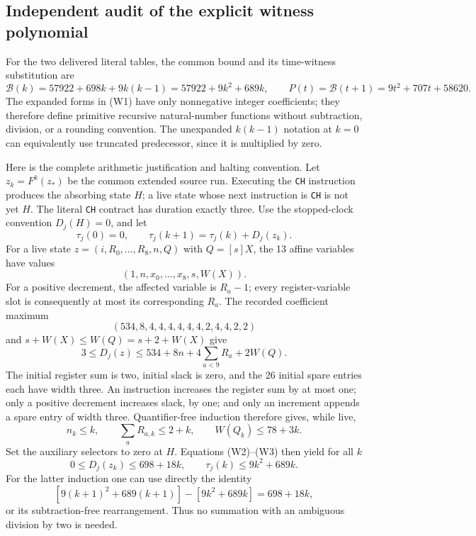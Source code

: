 \subsection{Independent audit of the explicit witness polynomial}
\label{sec:polynomial-witness-audit}

For the two delivered literal tables, the common bound and its
time-witness substitution are
\[
 \mathcal B(k)=57922+698k+9k(k-1)=57922+9k^2+689k,
 \qquad
 P(t)=\mathcal B(t+1)=9t^2+707t+58620.                         \tag{W1}
\]
The expanded forms in (W1) have only nonnegative integer coefficients;
they therefore define primitive recursive natural-number functions
without subtraction, division, or a rounding convention.  The
unexpanded $k(k-1)$ notation at $k=0$ can equivalently use truncated
predecessor, since it is multiplied by zero.

Here is the complete arithmetic justification and halting convention.
Let $z_k=F^k(z_*)$ be the common extended source run.  Executing the
\texttt{CH} instruction produces the absorbing state $H$; a live state
whose next instruction is \texttt{CH} is not yet $H$.  The literal
\texttt{CH} contract has duration exactly three.  Use the stopped-clock
convention $D_j(H)=0$, and let
\[
 \tau_j(0)=0,\qquad
 \tau_j(k+1)=\tau_j(k)+D_j(z_k).
                                                               \tag{W2}
\]
For a live state $z=(i,R_0,\ldots,R_8,n,Q)$ with $Q=[s]X$, the
13 affine variables have values
\[
                   (1,n,x_0,\ldots,x_8,s,W(X)).
\]
For a positive decrement, the affected variable is $R_a-1$;
every register-variable slot is consequently at most its corresponding
$R_a$.  The recorded coefficient maximum
\[
 (534,8,4,4,4,4,4,4,2,4,4,2,2)
\]
and $s+W(X)\le W(Q)=s+2+W(X)$ give
\[
 3\le D_j(z)\le534+8n+4\sum_{a<9}R_a+2W(Q).          \tag{W3}
\]
The initial register sum is two, initial slack is zero, and the 26
initial spare entries each have width three.  An instruction increases
the register sum by at most one; only a positive decrement increases
slack, by one; and only an increment appends a spare entry of width
three.  Quantifier-free induction therefore gives, while live,
\[
 n_k\le k,\qquad \sum_aR_{a,k}\le2+k,
 \qquad W(Q_k)\le78+3k.
\]
Set the auxiliary selectors to zero at $H$.  Equations (W2)--(W3)
then yield for all $k$
\[
 0\le D_j(z_k)\le698+18k,\qquad
 \tau_j(k)\le9k^2+689k.                              \tag{W4}
\]
For the latter induction one can use directly the identity
\[
 [9(k+1)^2+689(k+1)]-[9k^2+689k]=698+18k,
\]
or its subtraction-free rearrangement.  Thus no summation with an
ambiguous division by two is needed.

